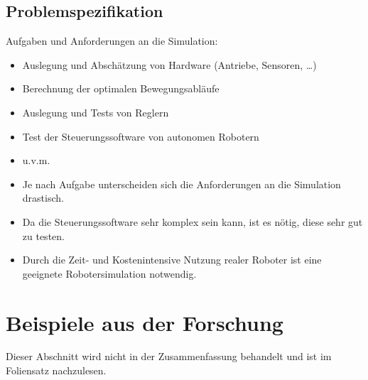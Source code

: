 	\section{Problemspezifikation} %
		Aufgaben und Anforderungen an die Simulation:
		\begin{itemize}
			\item Auslegung und Abschätzung von Hardware (Antriebe, Sensoren, \dots)
			\item Berechnung der optimalen Bewegungsabläufe
			\item Auslegung und Tests von Reglern
			\item Test der Steuerungssoftware von autonomen Robotern
			\item u.v.m.
			\item Je nach Aufgabe unterscheiden sich die Anforderungen an die Simulation drastisch.
			\item Da die Steuerungssoftware sehr komplex sein kann, ist es nötig, diese sehr gut zu testen.
			\item Durch die Zeit- und Kostenintensive Nutzung realer Roboter ist eine geeignete Robotersimulation notwendig.
		\end{itemize}

\chapter{Beispiele aus der Forschung} %
	Dieser Abschnitt wird nicht in der Zusammenfassung behandelt und ist im Foliensatz nachzulesen.
